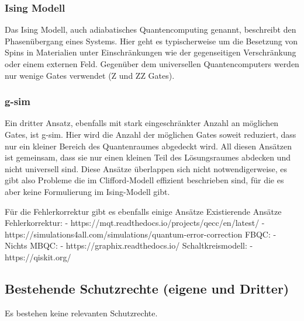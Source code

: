 \documentclass[11pt, a4paper]{article}
\newcommand{\instruction}[1]{{}}
\begin{document}
\subsubsection{Ising Modell}

Das Ising Modell, auch adiabatisches Quantencomputing genannt,
beschreibt den Phasenübergang eines Systems. Hier geht es
typischerweise um die Besetzung von Spins in Materialien unter
Einschränkungen wie der gegenseitigen Verschränkung oder einem
externen Feld. Gegenüber dem universellen Quantencomputers werden nur
wenige Gates verwendet (Z und ZZ Gates).


\subsubsection{g-sim}

Ein dritter Ansatz, ebenfalls mit stark eingeschränkter Anzahl an
möglichen Gates, ist g-sim. Hier wird die Anzahl der möglichen Gates
soweit reduziert, dass nur ein kleiner Bereich des Quantenraumes
abgedeckt wird.  All diesen Ansätzen ist gemeinsam, dass sie nur einen
kleinen Teil des Lösungsraumes abdecken und nicht universell
sind. Diese Ansätze überlappen sich nicht notwendigerweise, es gibt
also Probleme die im Clifford-Modell effizient beschrieben sind, für
die es aber keine Formulierung im Ising-Modell gibt.

Für die Fehlerkorrektur gibt es ebenfalls einige Ansätze Existierende
Ansätze Fehlerkorrektur: -
https://mqt.readthedocs.io/projects/qecc/en/latest/ -
https://simulations4all.com/simulations/quantum-error-correction FBQC:
- Nichts MBQC: - https://graphix.readthedocs.io/ Schaltkreismodell: -
https://qiskit.org/



\subsection{Bestehende Schutzrechte (eigene und Dritter)}

Es bestehen keine relevanten Schutzrechte.

\instruction{Welche (inter-)national bestehenden Schutzrechte
  betreffen die geplanten Arbeiten?}

\instruction{Verfügen die Partner über Schutzrechte, die das Vorhaben
  betreffen? Wenn ja, welche?}

\instruction{Wird eine spätere kommerzielle Verwertung nach
  gegenwärtigem Kenntnisstand durch die Schutzrechte Dritter
  eingeschränkt?}
\end{document}
